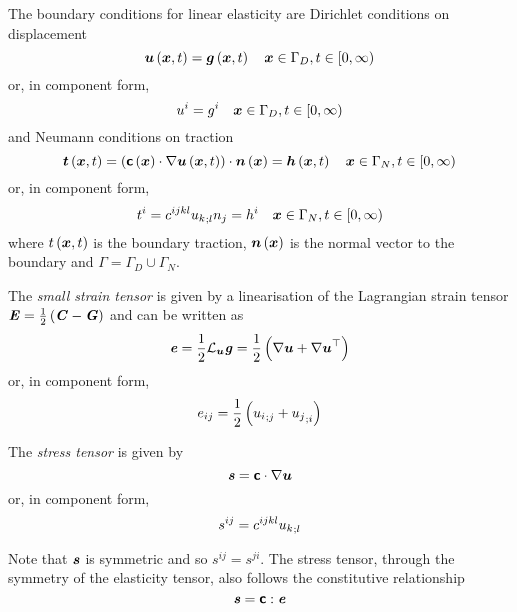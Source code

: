 The boundary conditions for linear elasticity are Dirichlet conditions on
displacement \ie
\begin{equation}
  \fnof{\vectr{u}}{\vectr{x},t} = \fnof{\vectr{g}}{\vectr{x},t} \quad \vectr{x}\in\Gamma_{D},t\in[0,\infty)
  \label{eqn:LinearElasticityDirichletBC} 
\end{equation}
or, in component form,
\begin{equation}
  u^{i}=g^{i} \quad \boldsymbol{x}\in\Gamma_{D},t\in[0,\infty)
\end{equation}
and Neumann conditions on traction \ie
\begin{equation}
  \fnof{\vectr{t}}{\vectr{x},t} =\dotprod{\pbrac{\dotprod{\fnof{\tensorfour{c}}{\vectr{x}}}
        {\gradient{}{\fnof{\vectr{u}}{\vectr{x},t}}}}}{\fnof{\normal}{\vectr{x}}}
  = \fnof{\vectr{h}}{\vectr{x},t} \quad \vectr{x}\in\Gamma_{N},t\in[0,\infty)
  \label{eqn:LinearElasticityNeumannBC} 
\end{equation}
or, in component form,
\begin{equation}
  t^{i}=c^{ijkl} {u_{k}}_{;l} n_{j}=h^{i} \quad \boldsymbol{x}\in\Gamma_{N},t\in[0,\infty)
\end{equation}
where $ t\left( \boldsymbol{x},t \right) $ is the boundary traction, $ \boldsymbol{n}\left( \boldsymbol{x} \right) $ is the normal
vector to the boundary and $\Gamma = \Gamma_D \cup \Gamma_N$.

The \emph{small strain tensor} is given by a linearisation of the Lagrangian
strain tensor $\boldsymbol{\mathit{E}}=\frac{1}{2}\left( \boldsymbol{\mathit{C}}-\boldsymbol{\mathit{G}} \right)$
and can be written as
\begin{equation}
  \tensortwo{e}=\frac{1}{2}\liederiv{\vectr{u}}{\tensortwo{g}}=\frac{1}{2}\pbrac{\gradient{}{\vectr{u}}+\transpose{\gradient{}{\vectr{u}}}}
\end{equation}
or, in component form,
\begin{equation}
  e_{ij}=\frac{1}{2}\left(  {u_{i}}_{;j} + {u_{j}}_{;i}  \right)
\end{equation}

The \emph{stress tensor} is given by
\begin{equation}
  \tensortwo{s}=\dotprod{\tensorfour{c}}{\gradient{}{\vectr{u}}}
\end{equation}
or, in component form,
\begin{equation}
  s^{ij}=c^{ijkl} {u_{k}}_{;l} 
\end{equation}

Note that $\boldsymbol{\mathit{s}}$ is symmetric and so $s^{ij}=s^{ji}$. The stress
tensor, through the symmetry of the elasticity tensor, also follows the
constitutive relationship
\begin{equation}
  \boldsymbol{\mathit{s}}= \boldsymbol{\mathsf{c}} : \boldsymbol{\mathit{e}} 
\end{equation}

